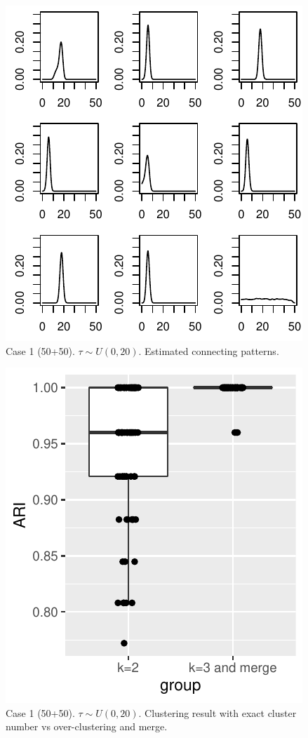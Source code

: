 \begin{figure}[H]
\includegraphics[width=.6\textwidth]{../simulation/plots/case1_conn_patt_mat_overclus}
\caption{Case 1 (50+50). $\tau\sim U(0,20)$. Estimated connecting patterns.}
\end{figure}


\begin{figure}[H]
\includegraphics[width=.5\textwidth]{../simulation/plots/case1_clus_res}
\caption{Case 1 (50+50). $\tau\sim U(0,20)$. Clustering result with exact cluster number vs over-clustering and merge.}
\end{figure}








